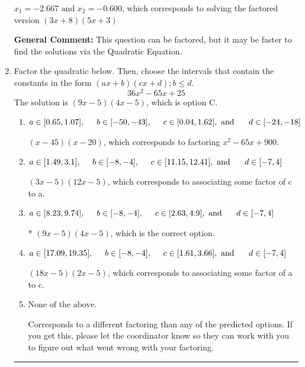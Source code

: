 \documentclass{extbook}[14pt]
\newcommand{\litem}[1]{\item #1

\rule{\textwidth}{0.4pt}}
\begin{document}
\begin{enumerate}
{\begin{enumerate}[label=\Alph*.]
$x_1 = -2.667 \text{ and } x_2 = -0.600$, which corresponds to solving the factored version $(3x + 8)(5x + 3)$
\end{enumerate}

\textbf{General Comment:} This question can be factored, but it may be faster to find the solutions via the Quadratic Equation.
}
\litem{
Factor the quadratic below. Then, choose the intervals that contain the constants in the form $(ax+b)(cx+d); b \leq d.$
\[ 36x^{2} -65 x + 25 \]
The solution is \( (9x -5)(4x -5) \), which is option C.\begin{enumerate}[label=\Alph*.]
\item \( a \in [0.65, 1.07], \hspace*{5mm} b \in [-50, -43], \hspace*{5mm} c \in [0.04, 1.62], \text{ and } \hspace*{5mm} d \in [-24, -18] \)

 $(x -45)(x -20)$, which corresponds to factoring $x^{2} -65 x + 900$.
\item \( a \in [1.49, 3.1], \hspace*{5mm} b \in [-8, -4], \hspace*{5mm} c \in [11.15, 12.41], \text{ and } \hspace*{5mm} d \in [-7, 4] \)

 $(3x -5)(12x -5)$, which corresponds to associating some factor of c to a.
\item \( a \in [8.23, 9.74], \hspace*{5mm} b \in [-8, -4], \hspace*{5mm} c \in [2.63, 4.9], \text{ and } \hspace*{5mm} d \in [-7, 4] \)

* $(9x -5)(4x -5)$, which is the correct option.
\item \( a \in [17.09, 19.35], \hspace*{5mm} b \in [-8, -4], \hspace*{5mm} c \in [1.61, 3.66], \text{ and } \hspace*{5mm} d \in [-7, 4] \)

 $(18x -5)(2x -5)$, which corresponds to associating some factor of a to c.
\item \( \text{None of the above.} \)

 Corresponds to a different factoring than any of the predicted options. If you get this, please let the coordinator know so they can work with you to figure out what went wrong with your factoring.
\end{enumerate}

}
\end{enumerate}
\end{document}
